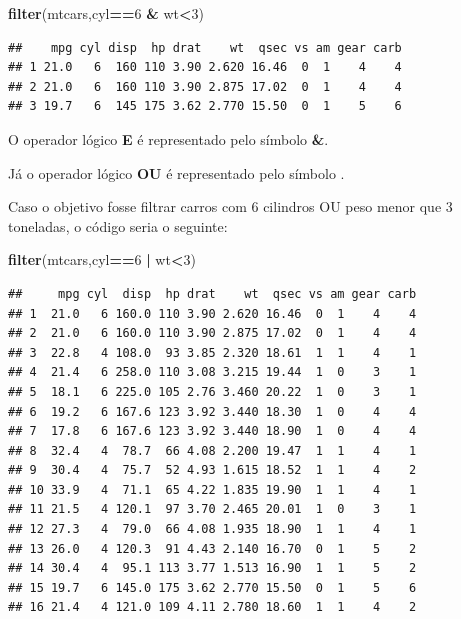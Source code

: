 \documentclass[
]{book}
\newenvironment{Shaded}{\begin{snugshade}}{\end{snugshade}}
\newcommand{\DecValTok}[1]{\textcolor[rgb]{0.00,0.00,0.81}{#1}}
\newcommand{\KeywordTok}[1]{\textcolor[rgb]{0.13,0.29,0.53}{\textbf{#1}}}
\newcommand{\NormalTok}[1]{#1}
\newcommand{\OperatorTok}[1]{\textcolor[rgb]{0.81,0.36,0.00}{\textbf{#1}}}
\newcommand{\StringTok}[1]{\textcolor[rgb]{0.31,0.60,0.02}{#1}}
\begin{document}
\begin{Shaded}
\begin{Highlighting}[]
\KeywordTok{filter}\NormalTok{(mtcars,cyl}\OperatorTok{==}\DecValTok{6} \OperatorTok{&}\StringTok{ }\NormalTok{wt}\OperatorTok{<}\DecValTok{3}\NormalTok{)}
\end{Highlighting}
\end{Shaded}

\begin{verbatim}
##    mpg cyl disp  hp drat    wt  qsec vs am gear carb
## 1 21.0   6  160 110 3.90 2.620 16.46  0  1    4    4
## 2 21.0   6  160 110 3.90 2.875 17.02  0  1    4    4
## 3 19.7   6  145 175 3.62 2.770 15.50  0  1    5    6
\end{verbatim}

O operador lógico \textbf{E} é representado pelo símbolo \textbf{\&}.

Já o operador lógico \textbf{OU} é representado pelo símbolo
\textbf{\textbar{}}.

Caso o objetivo fosse filtrar carros com 6 cilindros OU peso menor que 3
toneladas, o código seria o seguinte:

\begin{Shaded}
\begin{Highlighting}[]
\KeywordTok{filter}\NormalTok{(mtcars,cyl}\OperatorTok{==}\DecValTok{6} \OperatorTok{|}\StringTok{ }\NormalTok{wt}\OperatorTok{<}\DecValTok{3}\NormalTok{)}
\end{Highlighting}
\end{Shaded}

\begin{verbatim}
##     mpg cyl  disp  hp drat    wt  qsec vs am gear carb
## 1  21.0   6 160.0 110 3.90 2.620 16.46  0  1    4    4
## 2  21.0   6 160.0 110 3.90 2.875 17.02  0  1    4    4
## 3  22.8   4 108.0  93 3.85 2.320 18.61  1  1    4    1
## 4  21.4   6 258.0 110 3.08 3.215 19.44  1  0    3    1
## 5  18.1   6 225.0 105 2.76 3.460 20.22  1  0    3    1
## 6  19.2   6 167.6 123 3.92 3.440 18.30  1  0    4    4
## 7  17.8   6 167.6 123 3.92 3.440 18.90  1  0    4    4
## 8  32.4   4  78.7  66 4.08 2.200 19.47  1  1    4    1
## 9  30.4   4  75.7  52 4.93 1.615 18.52  1  1    4    2
## 10 33.9   4  71.1  65 4.22 1.835 19.90  1  1    4    1
## 11 21.5   4 120.1  97 3.70 2.465 20.01  1  0    3    1
## 12 27.3   4  79.0  66 4.08 1.935 18.90  1  1    4    1
## 13 26.0   4 120.3  91 4.43 2.140 16.70  0  1    5    2
## 14 30.4   4  95.1 113 3.77 1.513 16.90  1  1    5    2
## 15 19.7   6 145.0 175 3.62 2.770 15.50  0  1    5    6
## 16 21.4   4 121.0 109 4.11 2.780 18.60  1  1    4    2
\end{verbatim}
\end{document}

